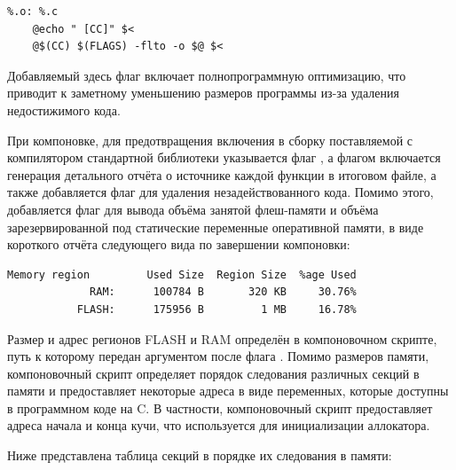 \documentclass[rusmathsym, eqnumwithinsec, amspack, hyperref]{bomgost}
\begin{document}
\lstset{
	language=c,
	basicstyle=\scriptsize\ttfamily,
	numbers=left,
	stepnumber=1,
	showstringspaces=false,
	tabsize=4,
	breaklines=true,
	breakatwhitespace=false,
	xleftmargin=.1\textwidth, xrightmargin=.1\textwidth,
	belowskip=1em, aboveskip=1em
}
\begin{lstlisting}
%.o: %.c
	@echo " [CC]" $<
	@$(CC) $(FLAGS) -flto -o $@ $<
\end{lstlisting}

Добавляемый здесь флаг {\footnotesize{}} включает полнопрограммную оптимизацию, что приводит к заметному уменьшению размеров программы из-за удаления недостижимого кода.

При компоновке, для предотвращения включения в сборку поставляемой с компилятором стандартной библиотеки указывается флаг {\footnotesize{}}, а флагом {\footnotesize{}} включается генерация детального отчёта о источнике каждой функции в итоговом файле, а также добавляется флаг {\footnotesize{}} для удаления незадействованного кода. Помимо этого, добавляется флаг {\footnotesize{}} для вывода объёма занятой флеш-памяти и объёма зарезервированной под статические переменные оперативной памяти, в виде короткого отчёта следующего вида по завершении компоновки:

\lstset{
	language=c,
	basicstyle=\scriptsize\ttfamily,
	numbers=left,
	stepnumber=1,
	showstringspaces=false,
	tabsize=4,
	breaklines=true,
	breakatwhitespace=false,
	xleftmargin=.1\textwidth, xrightmargin=.1\textwidth,
	belowskip=1em, aboveskip=1em
}
\begin{lstlisting}
Memory region         Used Size  Region Size  %age Used
             RAM:      100784 B       320 KB     30.76%
           FLASH:      175956 B         1 MB     16.78%
\end{lstlisting}

Размер и адрес регионов FLASH и RAM определён в компоновочном скрипте, путь к которому передан аргументом после флага {\footnotesize{}}. Помимо размеров памяти, компоновочный скрипт определяет порядок следования различных секций в памяти и предоставляет некоторые адреса в виде переменных, которые доступны в программном коде на C. В частности, компоновочный скрипт предоставляет адреса начала и конца кучи, что используется для инициализации аллокатора.

Ниже представлена таблица секций в порядке их следования в памяти:
\end{document}
